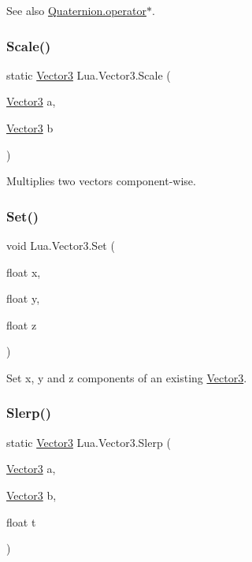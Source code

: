 See also \mbox{\hyperlink{class_lua_1_1_quaternion_af6d179e922217cf36197ed89c6cff2a4}{Quaternion.\+operator$\ast$}}. \mbox{\label{class_lua_1_1_vector3_a1b7601ca79dfd9b6f3ab3636508c197a}} 
\subsubsection{\texorpdfstring{Scale()}{Scale()}}
{\footnotesize\ttfamily static \mbox{\hyperlink{class_lua_1_1_vector3}{Vector3}} Lua.\+Vector3.\+Scale (\begin{DoxyParamCaption}\item[{\mbox{\hyperlink{class_lua_1_1_vector3}{Vector3}}}]{a,  }\item[{\mbox{\hyperlink{class_lua_1_1_vector3}{Vector3}}}]{b }\end{DoxyParamCaption})\hspace{0.3cm}{\ttfamily [static]}}



Multiplies two vectors component-\/wise. 

\mbox{\label{class_lua_1_1_vector3_a5f40e6344654b7590958df867f1d5b03}} 
\subsubsection{\texorpdfstring{Set()}{Set()}}
{\footnotesize\ttfamily void Lua.\+Vector3.\+Set (\begin{DoxyParamCaption}\item[{float}]{x,  }\item[{float}]{y,  }\item[{float}]{z }\end{DoxyParamCaption})}



Set x, y and z components of an existing \mbox{\hyperlink{class_lua_1_1_vector3}{Vector3}}. 

\mbox{\label{class_lua_1_1_vector3_a952dff0d8cc76a32589c2020e957adbf}} 
\subsubsection{\texorpdfstring{Slerp()}{Slerp()}}
{\footnotesize\ttfamily static \mbox{\hyperlink{class_lua_1_1_vector3}{Vector3}} Lua.\+Vector3.\+Slerp (\begin{DoxyParamCaption}\item[{\mbox{\hyperlink{class_lua_1_1_vector3}{Vector3}}}]{a,  }\item[{\mbox{\hyperlink{class_lua_1_1_vector3}{Vector3}}}]{b,  }\item[{float}]{t }\end{DoxyParamCaption})\hspace{0.3cm}{\ttfamily [static]}}



